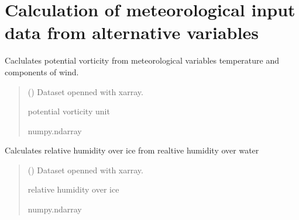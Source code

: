 \documentclass[a4paper,11pt,english]{sphinxmanual}
\begin{document}
\section{Calculation of meteorological input data from alternative variables}
\label{\detokenize{modules:module-envlib.calc_altrv_vars}}\label{\detokenize{modules:calculation-of-meteorological-input-data-from-alternative-variables}}

\begin{fulllineitems}
\label{\detokenize{modules:envlib.calc_altrv_vars.get_pvu}}
\pysigstartsignatures
{}
\pysigstopsignatures
\sphinxAtStartPar
Caclulates potential vorticity from meteorological variables temperature and components of wind.
\begin{quote}\begin{description}
\sphinxAtStartPar
{} () \textendash{} Dataset openned with xarray.

\sphinxAtStartPar
potential vorticity unit

\sphinxAtStartPar
numpy.ndarray

\end{description}\end{quote}

\end{fulllineitems}


\begin{fulllineitems}
\label{\detokenize{modules:envlib.calc_altrv_vars.get_rh_ice}}
\pysigstartsignatures
{}
\pysigstopsignatures
\sphinxAtStartPar
Calculates relative humidity over ice from realtive humidity over water
\begin{quote}\begin{description}
\sphinxAtStartPar
{} () \textendash{} Dataset openned with xarray.

\sphinxAtStartPar
relative humidity over ice

\sphinxAtStartPar
numpy.ndarray

\end{description}\end{quote}

\end{fulllineitems}
\end{document}
